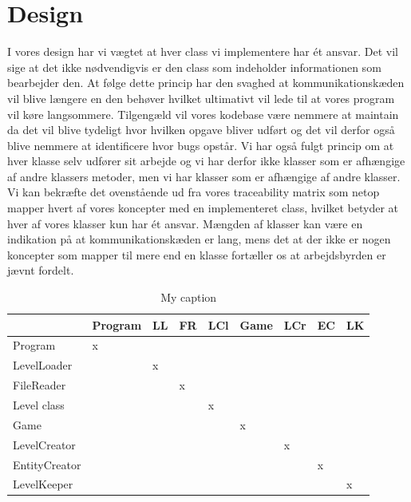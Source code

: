 \section{Design}
I vores design har vi vægtet at hver class vi implementere har ét ansvar. Det vil sige at det ikke nødvendigvis er den class som indeholder informationen som bearbejder den. At følge dette princip har den svaghed at kommunikationskæden vil blive længere en den behøver hvilket ultimativt vil lede til at vores program vil køre langsommere. Tilgengæld vil vores kodebase være nemmere at maintain da det vil blive tydeligt hvor hvilken opgave bliver udført og det vil derfor også blive nemmere at identificere hvor bugs opstår. Vi har også fulgt princip om at hver klasse selv udfører sit arbejde og vi har derfor ikke klasser som er afhængige af andre klassers metoder, men vi har klasser som er afhængige af andre klasser.\\
Vi kan bekræfte det ovenstående ud fra vores traceability matrix som netop mapper hvert af vores koncepter med en implementeret class, hvilket betyder at hver af vores klasser kun har ét ansvar. Mængden af klasser kan være en indikation på at kommunikationskæden er lang, mens det at der ikke er nogen koncepter som mapper til mere end en klasse fortæller os at arbejdsbyrden er jævnt fordelt.\\

\begin{table}[]
\centering
\caption{My caption}
\label{my-label}
\begin{tabular}{|l|l|l|l|l|l|l|l|l|}
\hline
              & Program & LL & FR & LCl & Game & LCr & EC & LK \\\hline
Program       & x       &             &            &       &      &              &               &             \\\hline
LevelLoader   &         & x           &            &       &      &              &               &             \\\hline
FileReader    &         &             & x          &       &      &              &               &             \\\hline
Level class        &         &             &            & x     &      &              &               &             \\\hline
Game          &         &             &            &       & x    &              &               &             \\\hline
LevelCreator  &         &             &            &       &      & x            &               &             \\\hline
EntityCreator &         &             &            &       &      &              & x             &             \\\hline
LevelKeeper   &         &             &            &       &      &              &               & x\\\hline
\end{tabular}
\end{table}


